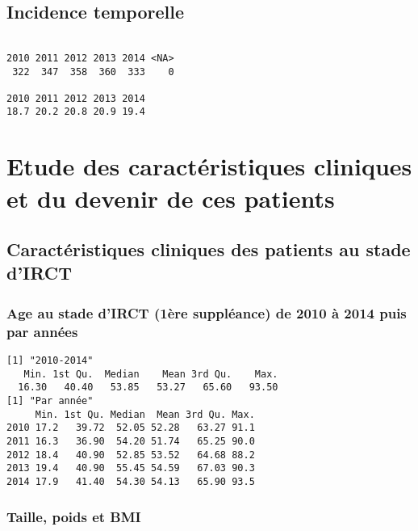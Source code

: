 \documentclass[11pt,a4paper]{article}\usepackage[]{graphicx}\usepackage[]{color}
\makeatletter
\newenvironment{kframe}{%
 \def\at@end@of@kframe{}%
 \ifinner\ifhmode%
  \def\at@end@of@kframe{\end{minipage}}%
  \begin{minipage}{\columnwidth}%
 \fi\fi%
 \def\FrameCommand##1{\hskip\@totalleftmargin \hskip-\fboxsep
 \colorbox{shadecolor}{##1}\hskip-\fboxsep
     \hskip-\linewidth \hskip-\@totalleftmargin \hskip\columnwidth}%
 \MakeFramed {\advance\hsize-\width
   \@totalleftmargin\z@ \linewidth\hsize
   \@setminipage}}%
 {\par\unskip\endMakeFramed%
 \at@end@of@kframe}
\newenvironment{knitrout}{}{} %
\makeatother
\begin{document}
  \subsection{Incidence temporelle}

\begin{knitrout}
\color{fgcolor}\begin{kframe}
\begin{verbatim}

2010 2011 2012 2013 2014 <NA> 
 322  347  358  360  333    0 

2010 2011 2012 2013 2014 
18.7 20.2 20.8 20.9 19.4 
\end{verbatim}
\end{kframe}
\end{knitrout}

\section{Etude des caractéristiques cliniques et du devenir de ces patients}

  \subsection{Caractéristiques cliniques des patients au stade d’IRCT}
  
    \subsubsection{Age au stade d’IRCT (1ère suppléance) de 2010 à 2014 puis par années}

\begin{knitrout}
\color{fgcolor}\begin{kframe}
\begin{verbatim}
[1] "2010-2014"
   Min. 1st Qu.  Median    Mean 3rd Qu.    Max. 
  16.30   40.40   53.85   53.27   65.60   93.50 
[1] "Par année"
     Min. 1st Qu. Median  Mean 3rd Qu. Max.
2010 17.2   39.72  52.05 52.28   63.27 91.1
2011 16.3   36.90  54.20 51.74   65.25 90.0
2012 18.4   40.90  52.85 53.52   64.68 88.2
2013 19.4   40.90  55.45 54.59   67.03 90.3
2014 17.9   41.40  54.30 54.13   65.90 93.5
\end{verbatim}
\end{kframe}
\end{knitrout}

    \subsubsection{Taille, poids et BMI}
  
\end{document}
